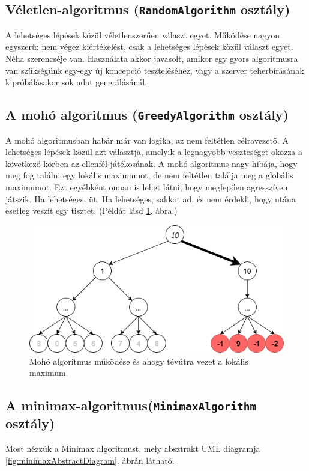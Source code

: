 \documentclass[twoside, a4paper, 12pt]{book}
\begin{document}
\subsection{Véletlen-algoritmus (\texttt{RandomAlgorithm} osztály)}
A lehetséges lépések közül véletlenszerűen választ egyet. Működése nagyon egyszerű: nem végez kiértékelést, csak a lehetséges lépések közül választ egyet. Néha szerencséje van.
Használata akkor javasolt, amikor egy gyors algoritmusra van szükségünk egy-egy új koncepció teszteléséhez, vagy a szerver teherbírásának kipróbálásakor sok adat generálásánál.

\subsection{A mohó algoritmus (\texttt{GreedyAlgorithm} osztály)}
A mohó algoritmusban habár már van logika, az nem feltétlen célravezető. A lehetséges lépések közül azt választja, amelyik a legnagyobb veszteséget okozza a következő körben az ellenfél játékosának. A mohó algoritmus nagy hibája, hogy meg fog találni egy lokális maximumot, de nem feltétlen találja meg a globális maximumot. Ezt egyébként onnan is lehet látni, hogy meglepően agresszíven játszik. Ha lehetséges, üt. Ha lehetséges, sakkot ad, és nem érdekli, hogy utána esetleg veszít egy tisztet.
(Példát lásd \ref{fig:greedyAlgorithmExampleDangerous}. ábra.)
\begin{figure}[htbp]
	\centering
	\includegraphics[width=\textwidth]{img/greedyAlgorithmExampleDangerous.png}
	\caption{Mohó algoritmus működése és ahogy tévútra vezet a lokális maximum.}
	\label{fig:greedyAlgorithmExampleDangerous}
\end{figure}

\subsection{A minimax-algoritmus(\texttt{MinimaxAlgorithm} osztály)}
Most nézzük a Minimax algoritmust, mely absztrakt UML diagramja \ref{fig:minimaxAbstractDiagram}. ábrán látható.
\end{document}
